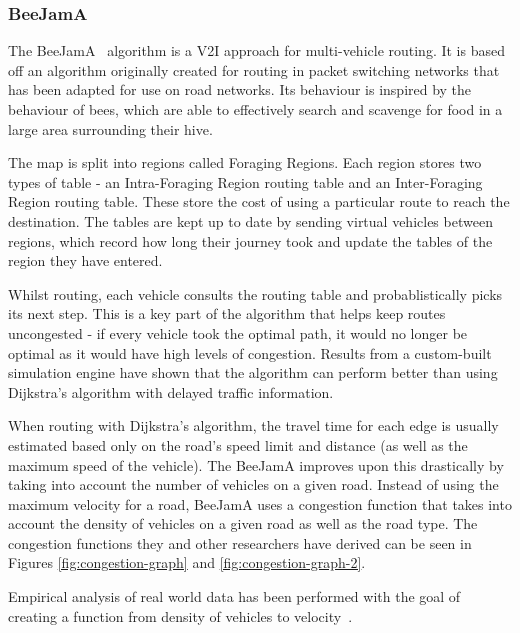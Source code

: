 \documentclass[ %
                    author={Alexander Hill},
                supervisor={Dr. Benjamin Sach},
                    degree={MEng},
                     title={MARMOSET},
                  subtitle={Multi-Agent Route Management using Online Simulation for Efficient Transportation},
                      type={research},
                      year={2016} ]{dissertation}
\begin{document}
\subsubsection{BeeJamA}\label{sec:beejama}

The BeeJamA~\cite{beejama} algorithm is a V2I approach for multi-vehicle routing. It is based
off an algorithm originally created for routing in packet switching networks
that has been adapted for use on road networks. Its behaviour is inspired by the
behaviour of bees, which are able to effectively search and scavenge for food in
a large area surrounding their hive.

The map is split into regions called Foraging Regions. Each region stores two
types of table - an Intra-Foraging Region routing table and an Inter-Foraging
Region routing table.  These store the cost of using a particular route to reach
the destination. The tables are kept up to date by sending virtual vehicles
between regions, which record how long their journey took and update the tables
of the region they have entered.

Whilst routing, each vehicle consults the routing table and probablistically
picks its next step. This is a key part of the algorithm that helps keep routes
uncongested - if every vehicle took the optimal path, it would no longer be
optimal as it would have high levels of congestion. Results from a custom-built
simulation engine have shown that the algorithm can perform better than using
Dijkstra's algorithm with delayed traffic information.

When routing with Dijkstra's algorithm, the travel time for each edge is usually
estimated based only on the road's speed limit and distance (as well as the
maximum speed of the vehicle). The BeeJamA improves upon this drastically by
taking into account the number of vehicles on a given road. Instead of using the
maximum velocity for a road, BeeJamA uses a congestion function that takes into
account the density of vehicles on a given road as well as the road type. The
congestion functions they and other researchers have derived can be seen in
Figures \ref{fig:congestion-graph} and \ref{fig:congestion-graph-2}.

Empirical analysis of real world data has been performed with the goal of
creating a function from density of vehicles to velocity~\cite{traffic-graphs,
traffic-thing-2}.
\end{document}
